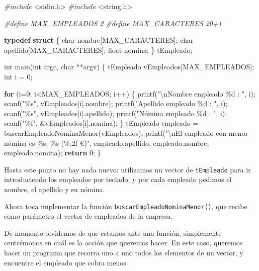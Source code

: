 \documentclass[
]{book}
\newenvironment{Shaded}{\begin{snugshade}}{\end{snugshade}}
\newcommand{\ControlFlowTok}[1]{\textcolor[rgb]{0.13,0.29,0.53}{\textbf{#1}}}
\newcommand{\DataTypeTok}[1]{\textcolor[rgb]{0.13,0.29,0.53}{#1}}
\newcommand{\DecValTok}[1]{\textcolor[rgb]{0.00,0.00,0.81}{#1}}
\newcommand{\ImportTok}[1]{#1}
\newcommand{\KeywordTok}[1]{\textcolor[rgb]{0.13,0.29,0.53}{\textbf{#1}}}
\newcommand{\NormalTok}[1]{#1}
\newcommand{\PreprocessorTok}[1]{\textcolor[rgb]{0.56,0.35,0.01}{\textit{#1}}}
\newcommand{\SpecialCharTok}[1]{\textcolor[rgb]{0.00,0.00,0.00}{#1}}
\newcommand{\StringTok}[1]{\textcolor[rgb]{0.31,0.60,0.02}{#1}}
\begin{document}
\begin{Shaded}
\begin{Highlighting}[]
\PreprocessorTok{\#include }\ImportTok{\textless{}stdio.h\textgreater{}}
\PreprocessorTok{\#include }\ImportTok{\textless{}string.h\textgreater{}}

\PreprocessorTok{\#define MAX\_EMPLEADOS 2}
\PreprocessorTok{\#define MAX\_CARACTERES 20+1}

\KeywordTok{typedef} \KeywordTok{struct}\NormalTok{ \{}
    \DataTypeTok{char}\NormalTok{ nombre[MAX\_CARACTERES];}
    \DataTypeTok{char}\NormalTok{ apellido[MAX\_CARACTERES];}
    \DataTypeTok{float}\NormalTok{ nomina;}
\NormalTok{\} tEmpleado;}

\DataTypeTok{int}\NormalTok{ main(}\DataTypeTok{int}\NormalTok{ argc, }\DataTypeTok{char}\NormalTok{ **argv) \{}
\NormalTok{    tEmpleado vEmpleados[MAX\_EMPLEADOS];}
    \DataTypeTok{int}\NormalTok{ i = }\DecValTok{0}\NormalTok{;}

    \ControlFlowTok{for}\NormalTok{ (i=}\DecValTok{0}\NormalTok{; i\textless{}MAX\_EMPLEADOS; i++) \{}
\NormalTok{        printf(}\StringTok{"}\SpecialCharTok{\textbackslash{}n}\StringTok{Nombre empleado \%d : "}\NormalTok{, i);}
\NormalTok{        scanf(}\StringTok{"\%s"}\NormalTok{, vEmpleados[i].nombre);}
\NormalTok{        printf(}\StringTok{"Apellido empleado \%d : "}\NormalTok{, i);}
\NormalTok{        scanf(}\StringTok{"\%s"}\NormalTok{, vEmpleados[i].apellido);}
\NormalTok{        printf(}\StringTok{"Nómina empleado \%d : "}\NormalTok{, i);}
\NormalTok{        scanf(}\StringTok{"\%f"}\NormalTok{, \&vEmpleados[i].nomina);}
\NormalTok{    \}}
\NormalTok{    tEmpleado empleado = buscarEmpleadoNominaMenor(vEmpleados);}
\NormalTok{    printf(}\StringTok{"}\SpecialCharTok{\textbackslash{}n}\StringTok{El empleado con menor nómina es \%s, \%s (\%.2f €)"}\NormalTok{, empleado.apellido, empleado.nombre, empleado.nomina);}
    \ControlFlowTok{return} \DecValTok{0}\NormalTok{;}
\NormalTok{\}}
\end{Highlighting}
\end{Shaded}

Hasta este punto no hay nada nuevo: utilizamos un vector de \texttt{tEmpleado} para ir introduciendo los empleados por teclado, y por cada empleado pedimos el nombre, el apellido y su nómina.

Ahora toca implementar la función \texttt{buscarEmpleadoNominaMenor()}, que recibe como parámetro el vector de empleados de la empresa.

De momento olvidemos de que estamos ante una función, simplemente centrémonos en cuál es la acción que queremos hacer. En este caso, queremos hacer un programa que recorra uno a uno todos los elementos de un vector, y encuentre el empleado que cobra menos.
\end{document}
